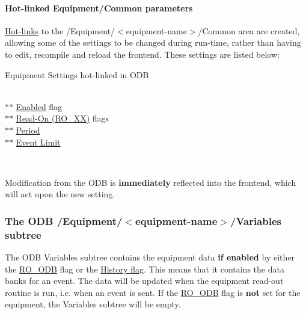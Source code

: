 \label{FE_ODB_equipment_tree_idx_hotlink_Equipment-common-parameters}
\hypertarget{FE_ODB_equipment_tree_idx_hotlink_Equipment-common-parameters}{}
 \hypertarget{FE_ODB_equipment_tree_FE_equipment_odb_hot_links}{}\paragraph{Hot-\/linked Equipment/Common parameters}\label{FE_ODB_equipment_tree_FE_equipment_odb_hot_links}
\hyperlink{RC_Hot_Link}{Hot-\/links} to the /Equipment/$<$equipment-\/name$>$/Common area are created, allowing some of the settings to be changed during run-\/time, rather than having to edit, recompile and reload the frontend. These settings are listed below: \par
 \begin{TabularC}{1}
\hline
Equipment Settings hot-\/linked in ODB\par
   \\
$\ast$$\ast$ \hyperlink{FE_table_FE_tbl_EqEnabled}{Enabled} flag   \\
$\ast$$\ast$ \hyperlink{FE_table_FE_tbl_ReadOn}{Read-\/On (RO\_\-XX)} flags   \\
$\ast$$\ast$ \hyperlink{FE_table_FE_tbl_Period}{Period}   \\
$\ast$$\ast$ \hyperlink{FE_table_FE_tbl_EventLimit}{Event Limit}  

\\
\end{TabularC}


Modification from the ODB is {\bfseries immediately} reflected into the frontend, which will act upon the new setting.\hypertarget{FE_ODB_equipment_tree_FE_ODB_equipment_variables}{}\subsubsection{The ODB /Equipment/$<$equipment-\/name$>$/Variables subtree}\label{FE_ODB_equipment_tree_FE_ODB_equipment_variables}
The ODB Variables subtree contains the equipment data {\bfseries if enabled} by either the \hyperlink{FE_table_FE_tbl_ReadOn}{RO\_\-ODB} flag or the \hyperlink{FE_table_FE_tbl_History}{History flag}. This means that it contains the data banks for an event. The data will be updated when the equipment read-\/out routine is run, i.e. when an event is sent. If the \hyperlink{FE_table_FE_tbl_ReadOn}{RO\_\-ODB} flag is {\bfseries not} set for the equipment, the Variables subtree will be empty.

